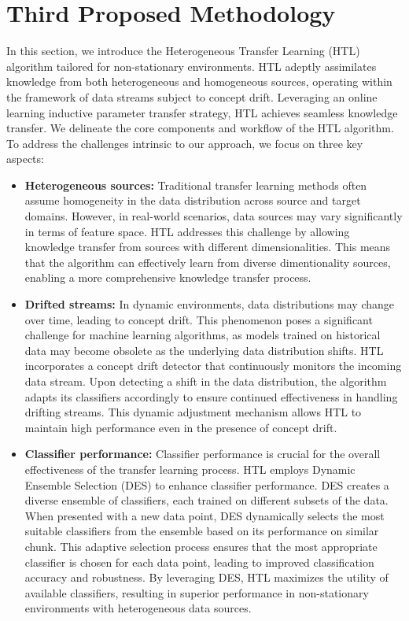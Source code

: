 \section{Third Proposed Methodology}\label{sec:6_third_proposed_approach}

In this section, we introduce the Heterogeneous Transfer Learning (HTL) algorithm tailored for non-stationary environments. HTL adeptly assimilates knowledge from both heterogeneous and homogeneous sources, operating within the framework of data streams subject to concept drift. Leveraging an online learning inductive parameter transfer strategy, HTL achieves seamless knowledge transfer. We delineate the core components and workflow of the HTL algorithm. To address the challenges intrinsic to our approach, we focus on three key aspects:
\begin{itemize}
	\item \textbf{Heterogeneous sources:} Traditional transfer learning methods often assume homogeneity in the data distribution across source and target domains. However, in real-world scenarios, data sources may vary significantly in terms of feature space. HTL addresses this challenge by allowing knowledge transfer from sources with different dimensionalities. This means that the algorithm can effectively learn from diverse dimentionality sources, enabling a more comprehensive knowledge transfer process.
	\item \textbf{Drifted streams:} In dynamic environments, data distributions may change over time, leading to concept drift. This phenomenon poses a significant challenge for machine learning algorithms, as models trained on historical data may become obsolete as the underlying data distribution shifts. HTL incorporates a concept drift detector that continuously monitors the incoming data stream. Upon detecting a shift in the data distribution, the algorithm adapts its classifiers accordingly to ensure continued effectiveness in handling drifting streams. This dynamic adjustment mechanism allows HTL to maintain high performance even in the presence of concept drift.
	\item \textbf{Classifier performance:} Classifier performance is crucial for the overall effectiveness of the transfer learning process. HTL employs Dynamic Ensemble Selection (DES) to enhance classifier performance. DES creates a diverse ensemble of classifiers, each trained on different subsets of the data. When presented with a new data point, DES dynamically selects the most suitable classifiers from the ensemble based on its performance on similar chunk. This adaptive selection process ensures that the most appropriate classifier is chosen for each data point, leading to improved classification accuracy and robustness. By leveraging DES, HTL maximizes the utility of available classifiers, resulting in superior performance in non-stationary environments with heterogeneous data sources.
\end{itemize}

